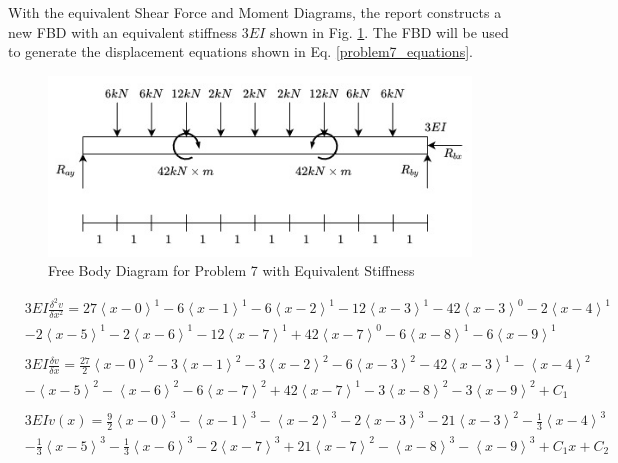 \documentclass[a4paper]{article}
\begin{document}
With the equivalent Shear Force and Moment Diagrams, the report constructs a new FBD with an equivalent stiffness $3EI$ shown in Fig. \ref{FBD_7_new}. The FBD will be used to generate the displacement equations shown in Eq. \ref{problem7_equations}.

\begin{figure}[h]
\includegraphics[width=\textwidth]{FBD/FBD_7_new.jpg}
\caption{Free Body Diagram for Problem 7 with Equivalent Stiffness}
\label{FBD_7_new}
\end{figure}

\begin{equation}
    \begin{split}
& 3EI \frac{\delta^2 v}{\delta x^2} = 27\left<x-0\right>^1 - 6\left<x-1\right>^1 - 6\left<x-2\right>^1 - 12\left<x-3\right>^1 - 42\left<x-3\right>^0 - 2\left<x-4\right>^1 \\
& - 2\left<x-5\right>^1 - 2\left<x-6\right>^1 - 12\left<x-7\right>^1 + 42\left<x-7\right>^0 - 6\left<x-8\right>^1 - 6\left<x-9\right>^1 \\
& \\
& 3EI \frac{\delta v}{\delta x} = \frac{27}{2}\left<x-0\right>^2 - 3\left<x-1\right>^2 - 3\left<x-2\right>^2 - 6\left<x-3\right>^2 - 42\left<x-3\right>^1 - \left<x-4\right>^2 \\
& - \left<x-5\right>^2 - \left<x-6\right>^2 - 6\left<x-7\right>^2 + 42\left<x-7\right>^1 - 3\left<x-8\right>^2 - 3\left<x-9\right>^2 + C_1 \\
& \\
& 3EI v(x) = \frac{9}{2}\left<x-0\right>^3 - \left<x-1\right>^3 - \left<x-2\right>^3 - 2\left<x-3\right>^3 - 21\left<x-3\right>^2 - \frac{1}{3}\left<x-4\right>^3 \\
& - \frac{1}{3}\left<x-5\right>^3 - \frac{1}{3}\left<x-6\right>^3 - 2\left<x-7\right>^3 + 21\left<x-7\right>^2 - \left<x-8\right>^3 - \left<x-9\right>^3 + C_1x + C_2 \\
    \end{split}
\label{problem7_equations}
\end{equation}
\end{document}
